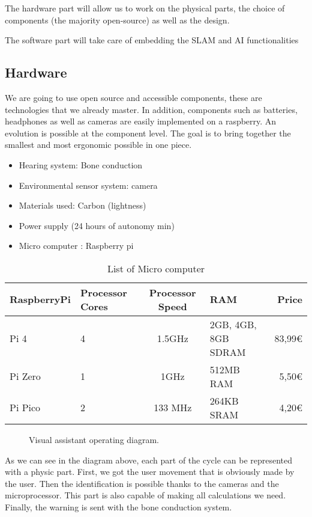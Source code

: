 \documentclass[conference,compsoc]{IEEEtran}
\begin{document}
The hardware part will allow us to work on the physical parts, the choice of components (the majority open-source) as well as the design.

The software part will take care of embedding the SLAM and AI functionalities
\subsection{Hardware}

We are going to use open source and accessible components, these are technologies that we already master. In addition, components such as batteries, headphones as well as cameras are easily implemented on a raspberry. An evolution is possible at the component level. The goal is to bring together the smallest and most ergonomic possible in one piece.

\begin{itemize}
  \item Hearing system: Bone conduction
  \item Environmental sensor system: camera
  \item Materials used: Carbon (lightness)
  \item Power supply (24 hours of autonomy min)
  \item Micro computer : Raspberry pi
\end{itemize}

\begin{table}[h]
\center
\begin{tabular}{|l|m{1cm}|c|m{1.7cm}|r|}
  \hline
  RaspberryPi&Processor Cores&Processor Speed & RAM & Price\\
  \hline
  Pi 4 & 4 & 1.5GHz &2GB, 4GB, 8GB SDRAM&83,99€\\
  Pi Zero & 1 & 1GHz &512MB RAM&5,50€\\
  Pi Pico & 2 & 133 MHz& 264KB SRAM&4,20€\\
  \hline
\end{tabular}
\caption{List of Micro computer}
\label{tab:listOfMicroComputer}
\end{table}

\begin{figure}[h]
\centering
{}
\caption{Visual assistant operating diagram.}
\end{figure}

As we can see in the diagram above, each part of the cycle can be represented with a physic part. First, we got the user movement that is obviously made by the user. Then the identification is possible thanks to the cameras and the microprocessor. This part is also capable of making all calculations we need. Finally, the warning is sent with the bone conduction system.
\end{document}

